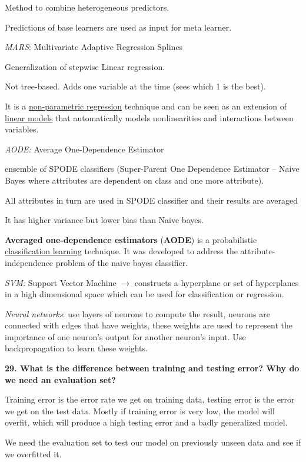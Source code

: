 Method to combine heterogeneous predictors.

Predictions of base learners are used as input for meta learner.

\textit{MARS}: Multivariate Adaptive Regression Splines

Generalization of stepwise Linear regression.

Not tree-based. Adds one variable at the time (sees which 1 is the
best).

It is a
\href{https://en.wikipedia.org/wiki/Non-parametric_regression}{non-parametric
regression} technique and can be seen as an extension of
\href{https://en.wikipedia.org/wiki/Linear_model}{linear models} that
automatically models nonlinearities and interactions between variables.

\textit{AODE:} Average One-Dependence Estimator

ensemble of SPODE classifiers (Super-Parent One Dependence Estimator --
Naive Bayes where attributes are dependent on class and one more
attribute).

All attributes in turn are used in SPODE classifier and their results
are averaged

It has higher variance but lower bias than Naive bayes.

\textbf{Averaged one-dependence estimators} (\textbf{AODE}) is a
probabilistic
\href{https://en.wikipedia.org/wiki/Classifier_(mathematics)}{classification
learning} technique. It was developed to address the
attribute-independence problem of the naive bayes classifier.

\textit{SVM:} Support Vector Machine $\rightarrow$ constructs a
hyperplane or set of hyperplanes in a high dimensional space which can
be used for classification or regression.

\textit{Neural networks}: use layers of neurons to compute the
result, neurons are connected with edges that have weights, these
weights are used to represent the importance of one neuron's output for
another neuron's input. Use backpropagation to learn these weights.

\textbf{29. What is the difference between training and testing error?
Why do we need an evaluation set?}

Training error is the error rate we get on training data, testing error
is the error we get on the test data. Mostly if training error is very
low, the model will overfit, which will produce a high testing error and
a badly generalized model.

We need the evaluation set to test our model on previously unseen data
and see if we overfitted it.

